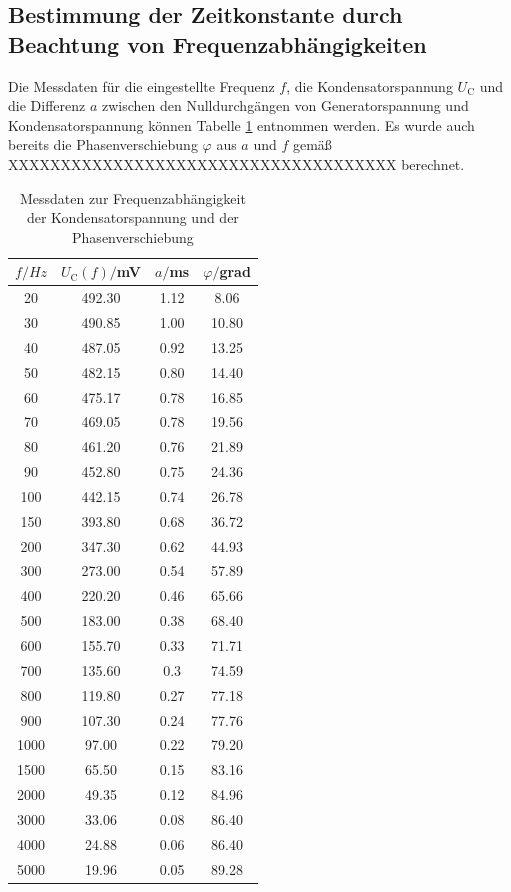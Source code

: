 \subsection{Bestimmung der Zeitkonstante durch Beachtung von Frequenzabhängigkeiten}

Die Messdaten für die eingestellte Frequenz $f$, die Kondensatorspannung
$U_\text{C}$ und die Differenz $a$ zwischen den Nulldurchgängen von Generatorspannung
und Kondensatorspannung können Tabelle \ref{tab:frequenzen} entnommen werden. Es wurde auch bereits
die Phasenverschiebung $\varphi$ aus $a$ und $f$ gemäß XXXXXXXXXXXXXXXXXXXXXXXXXXXXXXXXXXXXX berechnet.

\begin{table}
\centering
\caption{Messdaten zur Frequenzabhängigkeit der Kondensatorspannung und der Phasenverschiebung}
\label{tab:frequenzen}
\begin{tabular}{c c c c}
\toprule
$f/Hz$ & $U_\text{C}(f)/$mV & $a/$ms & $\varphi/$grad\\
\midrule
  20	&  492.30  &  1.12  &   8.06 \\
  30	&  490.85  &  1.00  &  10.80 \\
  40	&  487.05  &  0.92  &  13.25 \\
  50	&  482.15  &  0.80  &  14.40 \\
  60	&  475.17  &  0.78  &  16.85 \\
  70	&  469.05  &  0.78  &  19.56 \\
  80	&  461.20  &  0.76  &  21.89 \\
  90	&  452.80  &  0.75  &  24.36 \\
 100	&  442.15  &  0.74  &  26.78 \\
 150	&  393.80  &  0.68  &  36.72 \\
 200	&  347.30  &  0.62  &  44.93 \\
 300	&  273.00  &  0.54  &  57.89 \\
 400	&  220.20  &  0.46  &  65.66 \\
 500	&  183.00  &  0.38  &  68.40 \\
 600	&  155.70  &  0.33  &  71.71 \\
 700	&  135.60  &  0.3   &  74.59 \\
 800	&  119.80  &  0.27  &  77.18 \\
 900	&  107.30  &  0.24  &  77.76 \\
1000	&   97.00  &  0.22  &  79.20 \\
1500	&   65.50  &  0.15  &  83.16 \\
2000	&   49.35  &  0.12  &  84.96 \\
3000	&   33.06  &  0.08  &  86.40 \\
4000	&   24.88  &  0.06  &  86.40 \\
5000	&   19.96  &  0.05  &  89.28 \\
\bottomrule
\end{tabular}
\end{table}

